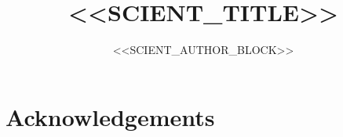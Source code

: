 \documentclass[11pt,a4paper,oneside]{report}
\title{<<SCIENT_TITLE>>}
\author{<<SCIENT_AUTHOR_BLOCK>>}
\date{}
\theoremstyle{definition}
\theoremstyle{remark}
\begin{document}
\maketitle

\begin{abstract}
\end{abstract}

\chapter*{Acknowledgements}
\par

\tableofcontents
\listoffigures
\listoftables








\appendix




\end{document}
